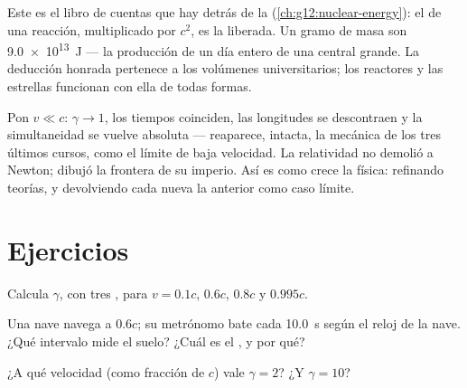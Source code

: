 \begin{remark}\label{rem:g12:special-relativity:emc2seen}
Este es el libro de cuentas que hay detrás de la 
(\cref{ch:g12:nuclear-energy}): el  de una reacción, multiplicado por
$c^2$, es la  liberada. Un gramo de masa son \qty{9.0e13}{J} --- la producción
de un día entero de una central grande. La deducción honrada pertenece a los volúmenes
universitarios; los reactores y las estrellas funcionan con ella de todas formas.
\end{remark}

\begin{remark}\label{rem:g12:special-relativity:newton}
Pon $v \ll c$: $\gamma \to 1$, los tiempos coinciden, las longitudes se descontraen y
la simultaneidad se vuelve absoluta --- reaparece, intacta, la mecánica de los tres
últimos cursos, como el límite de baja velocidad. La relatividad no demolió a Newton;
dibujó la frontera de su imperio. Así es como crece la física: refinando teorías, y
devolviendo cada nueva la anterior como caso límite.
\end{remark}

\section{Ejercicios}

\begin{exercise}[$\star$]\label{exo:g12:special-relativity:1}
Calcula $\gamma$, con tres , para $v = 0.1c$, $0.6c$, $0.8c$ y
$0.995c$.
\end{exercise}

\begin{exercise}[$\star$]\label{exo:g12:special-relativity:2}
Una nave navega a $0.6c$; su metrónomo bate cada \qty{10.0}{s} según el reloj de la
nave. ¿Qué intervalo mide el suelo? ¿Cuál es el , y por qué?
\end{exercise}

\begin{exercise}[$\star$]\label{exo:g12:special-relativity:3}
¿A qué velocidad (como fracción de $c$) vale $\gamma = 2$? ¿Y $\gamma = 10$?
\end{exercise}

